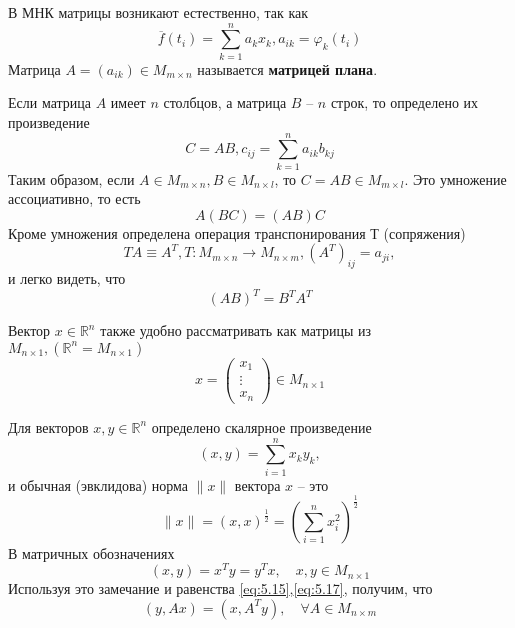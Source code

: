 В МНК матрицы возникают естественно, так как
 \begin{equation}
	\overline{f} (t_i) = \sum_{k=1}^n {a_k x_k}, a_{ik} = \varphi_k(t_i) 
\end{equation}
Матрица $A = (a_{ik}) \in M_{m \times n}$ называется \textbf{матрицей плана}.

Если матрица $A$ имеет $n$ столбцов, а матрица $B$ -- $n$ строк, то определено их произведение
\begin{equation}
	C = AB, c_{ij} = \sum_{k=1}^n{a_{ik}b_{kj}}
\end{equation}
Таким образом, если $A \in M_{m \times n}, B \in M_{n \times l}$, то $C = AB \in M_{m \times l}$. Это умножение ассоциативно, то есть
\begin{equation}\label{eq:5.15}
	A (BC) = (AB) C
\end{equation}
Кроме умножения определена операция транспонирования Т (сопряжения)
\begin{equation}
	TA \equiv A^T, T: M_{m\times n} \rightarrow M_{n\times m}, (A^T)_{ij} = a_{ji},
\end{equation}
и легко видеть, что
\begin{equation}\label{eq:5.17}
	(AB) ^ T = B^T A^T
\end{equation}

Вектор $x \in \mathbb{R}^n$ также удобно рассматривать как матрицы из $M_{n \times 1}, (\mathbb{R}^n = M_{n \times 1})$
\begin{equation}
	x = \begin{pmatrix}
		x_1\\
		\vdots\\
		x_n
	\end{pmatrix}
	\in M_{n\times 1}
\end{equation}

Для векторов $x, y \in \mathbb{R}^n$ определено скалярное произведение
\begin{equation}
	(x, y) = \sum_{i=1}^n x_k y_k, 
\end{equation}
и обычная (эвклидова) норма $\|x\|$ вектора $x$  -- это
\begin{equation} 
	\|x \| = (x, x)^{\frac{1}{2} }= (\sum_{i=1}^n x_i^2)^{\frac{1}{2}}
\end{equation}
В матричных обозначениях
\begin{equation}
	(x, y) = x^T y = y^T x,\quad  x,y \in M_{n \times 1}
\end{equation}
Используя это замечание и равенства \ref{eq:5.15},\ref{eq:5.17}, получим, что
\begin{equation}\label{eq:5.22}
	(y, Ax) = (x, A^T y), \quad \forall A \in M_{n\times m}
\end{equation}
	

